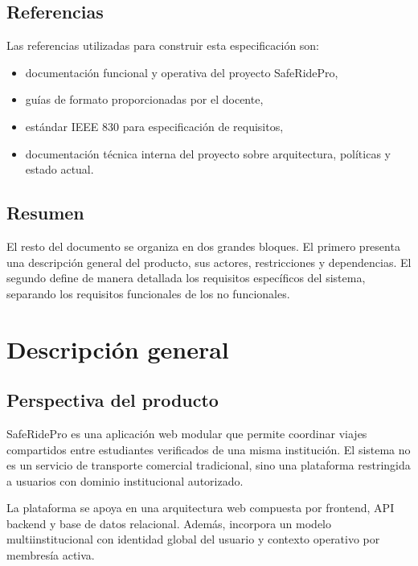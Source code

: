\documentclass[12pt]{article}
\begin{document}
\subsection{Referencias}

Las referencias utilizadas para construir esta especificaci\'on son:

\begin{itemize}[leftmargin=1.2cm]
    \item documentaci\'on funcional y operativa del proyecto SafeRidePro,
    \item gu\'ias de formato proporcionadas por el docente,
    \item est\'andar IEEE 830 para especificaci\'on de requisitos,
    \item documentaci\'on t\'ecnica interna del proyecto sobre arquitectura, pol\'iticas y estado actual.
\end{itemize}

\subsection{Resumen}

El resto del documento se organiza en dos grandes bloques. El primero presenta una descripci\'on general del producto, sus actores, restricciones y dependencias. El segundo define de manera detallada los requisitos espec\'ificos del sistema, separando los requisitos funcionales de los no funcionales.

\section{Descripci\'on general}

\subsection{Perspectiva del producto}

SafeRidePro es una aplicaci\'on web modular que permite coordinar viajes compartidos entre estudiantes verificados de una misma instituci\'on. El sistema no es un servicio de transporte comercial tradicional, sino una plataforma restringida a usuarios con dominio institucional autorizado.

La plataforma se apoya en una arquitectura web compuesta por frontend, API backend y base de datos relacional. Adem\'as, incorpora un modelo multiinstitucional con identidad global del usuario y contexto operativo por membres\'ia activa.
\end{document}
